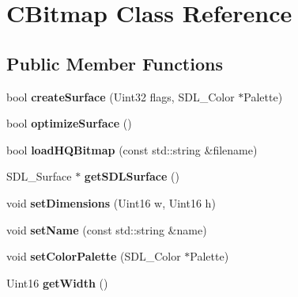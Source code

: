 \hypertarget{class_c_bitmap}{
\section{CBitmap Class Reference}
\label{class_c_bitmap}
}
\subsection*{Public Member Functions}
\begin{DoxyCompactItemize}
\item 
\hypertarget{class_c_bitmap_ae4f89e0338930ed52c0f2d321c61d115}{
bool {\bfseries createSurface} (Uint32 flags, SDL\_\-Color $\ast$Palette)}
\label{class_c_bitmap_ae4f89e0338930ed52c0f2d321c61d115}

\item 
\hypertarget{class_c_bitmap_a52aa6ee87be6eb4c09525902111bcffa}{
bool {\bfseries optimizeSurface} ()}
\label{class_c_bitmap_a52aa6ee87be6eb4c09525902111bcffa}

\item 
\hypertarget{class_c_bitmap_a757e02fa176d7e28946f891baa3dd93d}{
bool {\bfseries loadHQBitmap} (const std::string \&filename)}
\label{class_c_bitmap_a757e02fa176d7e28946f891baa3dd93d}

\item 
\hypertarget{class_c_bitmap_a077df1de3d5b40c97a05597d1dfaa19f}{
SDL\_\-Surface $\ast$ {\bfseries getSDLSurface} ()}
\label{class_c_bitmap_a077df1de3d5b40c97a05597d1dfaa19f}

\item 
\hypertarget{class_c_bitmap_a84f3a3d887d6af4e0098ac0f94bb5ff3}{
void {\bfseries setDimensions} (Uint16 w, Uint16 h)}
\label{class_c_bitmap_a84f3a3d887d6af4e0098ac0f94bb5ff3}

\item 
\hypertarget{class_c_bitmap_ae864d52ae57392b8e3f044cafda81787}{
void {\bfseries setName} (const std::string \&name)}
\label{class_c_bitmap_ae864d52ae57392b8e3f044cafda81787}

\item 
\hypertarget{class_c_bitmap_ae2dcfaed869f54c8745d443e2b9043c0}{
void {\bfseries setColorPalette} (SDL\_\-Color $\ast$Palette)}
\label{class_c_bitmap_ae2dcfaed869f54c8745d443e2b9043c0}

\item 
\hypertarget{class_c_bitmap_ab0926d7c44ee5caa83802b0d627b5b3c}{
Uint16 {\bfseries getWidth} ()}
\label{class_c_bitmap_ab0926d7c44ee5caa83802b0d627b5b3c}


\end{DoxyCompactItemize}
